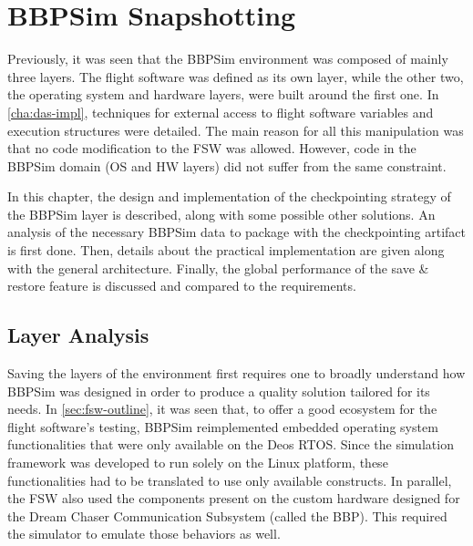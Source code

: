 {
\setlength{\parindent}{2em}
\chapter{BBPSim Snapshotting}\label{cha:bbpsim-impl}
Previously, it was seen that the \gls{BBPSim} environment was composed of mainly three layers. The flight software was defined as its own layer, while the other two, the operating system and hardware layers, were built around the first one. In \autoref{cha:das-impl}, techniques for external access to flight software variables and execution structures were detailed. The main reason for all this manipulation was that no code modification to the FSW was allowed. However, code in the BBPSim domain (OS and HW layers) did not suffer from the same constraint. 

In this chapter, the design and implementation of the checkpointing strategy of the BBPSim layer is described, along with some possible other solutions. An analysis of the necessary BBPSim data to package with the checkpointing artifact is first done. Then, details about the practical implementation are given along with the general architecture. Finally, the global performance of the save \& restore feature is discussed and compared to the requirements. 

\section{Layer Analysis}
Saving the layers of the environment first requires one to broadly understand how BBPSim was designed in order to produce a quality solution tailored for its needs. In \autoref{sec:fsw-outline}, it was seen that, to offer a good ecosystem for the flight software's testing, \gls{BBPSim} reimplemented embedded operating system functionalities that were only available on the Deos \gls{RTOS}. Since the simulation framework was developed to run solely on the Linux platform, these functionalities had to be translated to use only available constructs. In parallel, the FSW also used the components present on the custom hardware designed for the Dream Chaser Communication Subsystem (called the \gls{BBP}). This required the simulator to emulate those behaviors as well.

}
